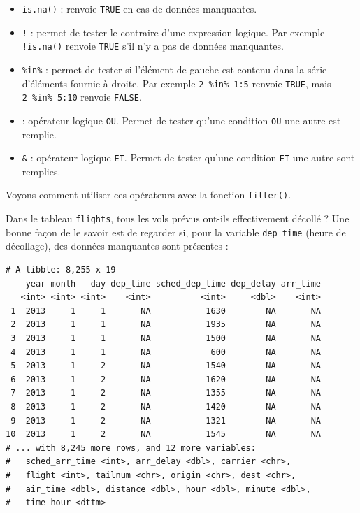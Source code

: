\documentclass[a4paperpaper,]{article}
\newenvironment{Shaded}{\begin{snugshade}}{\end{snugshade}}
\newcommand{\KeywordTok}[1]{\textcolor[rgb]{0.12,0.11,0.11}{\textbf{#1}}}
\newcommand{\NormalTok}[1]{\textcolor[rgb]{0.12,0.11,0.11}{#1}}
\newcommand{\OperatorTok}[1]{\textcolor[rgb]{0.12,0.11,0.11}{#1}}
\newcommand{\StringTok}[1]{\textcolor[rgb]{0.75,0.01,0.01}{#1}}
\providecommand{\tightlist}{%
  \setlength{\itemsep}{0pt}\setlength{\parskip}{0pt}}
\begin{document}
\begin{itemize}
\tightlist
\item
  \texttt{is.na()} : renvoie \texttt{TRUE} en cas de données manquantes.
\item
  \texttt{!} : permet de tester le contraire d'une expression logique. Par exemple \texttt{!is.na()} renvoie \texttt{TRUE} s'il n'y a pas de données manquantes.
\item
  \texttt{\%in\%} : permet de tester si l'élément de gauche est contenu dans la série d'éléments fournie à droite. Par exemple \texttt{2\ \%in\%\ 1:5} renvoie \texttt{TRUE}, mais \texttt{2\ \%in\%\ 5:10} renvoie \texttt{FALSE}.
\item
  \texttt{\textbar{}} : opérateur logique \texttt{OU}. Permet de tester qu'une condition \texttt{OU} une autre est remplie.
\item
  \texttt{\&} : opérateur logique \texttt{ET}. Permet de tester qu'une condition \texttt{ET} une autre sont remplies.
\end{itemize}

Voyons comment utiliser ces opérateurs avec la fonction \texttt{filter()}.

Dans le tableau \texttt{flights}, tous les vols prévus ont-ils effectivement décollé ? Une bonne façon de le savoir est de regarder si, pour la variable \texttt{dep\_time} (heure de décollage), des données manquantes sont présentes :

\begin{Shaded}
\end{Shaded}

\begin{verbatim}
# A tibble: 8,255 x 19
    year month   day dep_time sched_dep_time dep_delay arr_time
   <int> <int> <int>    <int>          <int>     <dbl>    <int>
 1  2013     1     1       NA           1630        NA       NA
 2  2013     1     1       NA           1935        NA       NA
 3  2013     1     1       NA           1500        NA       NA
 4  2013     1     1       NA            600        NA       NA
 5  2013     1     2       NA           1540        NA       NA
 6  2013     1     2       NA           1620        NA       NA
 7  2013     1     2       NA           1355        NA       NA
 8  2013     1     2       NA           1420        NA       NA
 9  2013     1     2       NA           1321        NA       NA
10  2013     1     2       NA           1545        NA       NA
# ... with 8,245 more rows, and 12 more variables:
#   sched_arr_time <int>, arr_delay <dbl>, carrier <chr>,
#   flight <int>, tailnum <chr>, origin <chr>, dest <chr>,
#   air_time <dbl>, distance <dbl>, hour <dbl>, minute <dbl>,
#   time_hour <dttm>
\end{verbatim}
\end{document}
